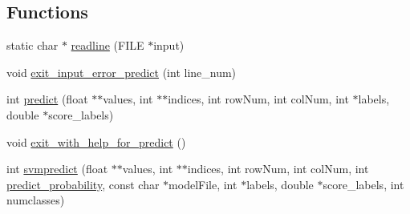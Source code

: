 \subsection*{Functions}
\begin{DoxyCompactItemize}
\item 
static char $\ast$ \hyperlink{svm-predict-old_8cpp_aa324656b7bb4eb3ee42699d33c21ef7a}{readline} (F\-I\-L\-E $\ast$input)
\item 
void \hyperlink{svm-predict-old_8cpp_a9f4f4674bfe1596b0b4ff14005b047f5}{exit\-\_\-input\-\_\-error\-\_\-predict} (int line\-\_\-num)
\item 
int \hyperlink{svm-predict-old_8cpp_ae6ecfcdf838de45a1c4e65c6341d0bfa}{predict} (float $\ast$$\ast$values, int $\ast$$\ast$indices, int row\-Num, int col\-Num, int $\ast$labels, double $\ast$score\-\_\-labels)
\item 
void \hyperlink{svm-predict-old_8cpp_a7afe98ad0e31dd12549d624e922f3eae}{exit\-\_\-with\-\_\-help\-\_\-for\-\_\-predict} ()
\item 
int \hyperlink{svm-predict-old_8cpp_aca788894c462e86397220c8180009a98}{svmpredict} (float $\ast$$\ast$values, int $\ast$$\ast$indices, int row\-Num, int col\-Num, int \hyperlink{_2svm-predict_8cpp_a1501132f5226b295e5300d74da55a2b9}{predict\-\_\-probability}, const char $\ast$model\-File, int $\ast$labels, double $\ast$score\-\_\-labels, int numclasses)
\end{DoxyCompactItemize}
